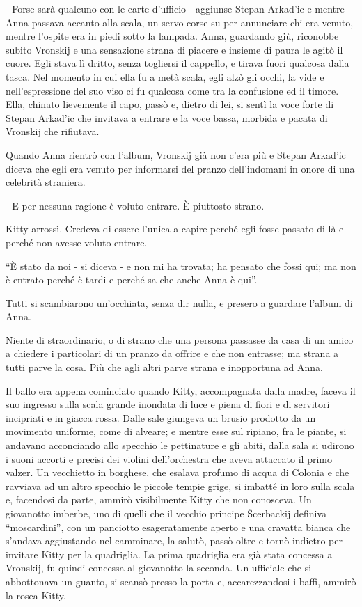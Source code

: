 - Forse sarà qualcuno con le carte d'ufficio - aggiunse Stepan Arkad'ic e mentre Anna passava accanto alla scala, un servo corse su per annunciare chi era venuto, mentre l'ospite era in piedi sotto la lampada. Anna, guardando giù, riconobbe subito Vronskij e una sensazione strana di piacere e insieme di paura le agitò il cuore. Egli stava lì dritto, senza togliersi il cappello, e tirava fuori qualcosa dalla tasca. Nel momento in cui ella fu a metà scala, egli alzò gli occhi, la vide e nell'espressione del suo viso ci fu qualcosa come tra la confusione ed il timore. Ella, chinato lievemente il capo, passò e, dietro di lei, si sentì la voce forte di Stepan Arkad'ic che invitava a entrare e la voce bassa, morbida e pacata di Vronskij che rifiutava. 

Quando Anna rientrò con l'album, Vronskij già non c'era più e Stepan Arkad'ic diceva che egli era venuto per informarsi del pranzo dell'indomani in onore di una celebrità straniera. 

- E per nessuna ragione è voluto entrare. È piuttosto strano. 

Kitty arrossì. Credeva di essere l'unica a capire perché egli fosse passato di là e perché non avesse voluto entrare. 

``È stato da noi - si diceva - e non mi ha trovata; ha pensato che fossi qui; ma non è entrato perché è tardi e perché sa che anche Anna è qui''. 

Tutti si scambiarono un'occhiata, senza dir nulla, e presero a guardare l'album di Anna. 

Niente di straordinario, o di strano che una persona passasse da casa di un amico a chiedere i particolari di un pranzo da offrire e che non entrasse; ma strana a tutti parve la cosa. Più che agli altri parve strana e inopportuna ad Anna. 

\label{xxii} 

Il ballo era appena cominciato quando Kitty, accompagnata dalla madre, faceva il suo ingresso sulla scala grande inondata di luce e piena di fiori e di servitori incipriati e in giacca rossa. Dalle sale giungeva un brusio prodotto da un movimento uniforme, come di alveare; e mentre esse sul ripiano, fra le piante, si andavano acconciando allo specchio le pettinature e gli abiti, dalla sala si udirono i suoni accorti e precisi dei violini dell'orchestra che aveva attaccato il primo valzer. Un vecchietto in borghese, che esalava profumo di acqua di Colonia e che ravviava ad un altro specchio le piccole tempie grige, si imbatté in loro sulla scala e, facendosi da parte, ammirò visibilmente Kitty che non conosceva. Un giovanotto imberbe, uno di quelli che il vecchio principe Šcerbackij definiva ``moscardini'', con un panciotto esageratamente aperto e una cravatta bianca che s'andava aggiustando nel camminare, la salutò, passò oltre e tornò indietro per invitare Kitty per la quadriglia. La prima quadriglia era già stata concessa a Vronskij, fu quindi concessa al giovanotto la seconda. Un ufficiale che si abbottonava un guanto, si scansò presso la porta e, accarezzandosi i baffi, ammirò la rosea Kitty. 

